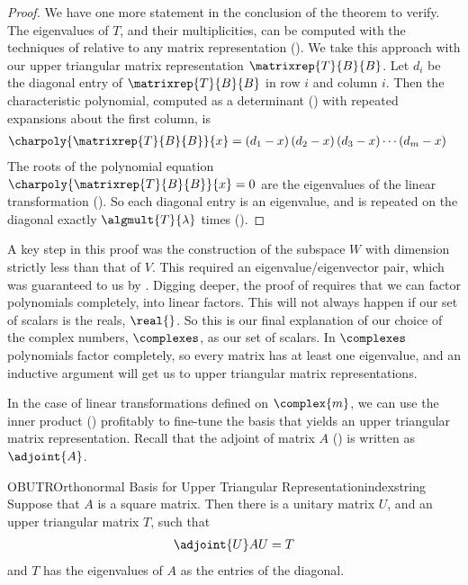 \begin{proof}
%
We have one more statement in the conclusion of the theorem to verify.  The eigenvalues of $T$, and their multiplicities, can be computed with the techniques of  relative to any matrix representation (). We take this approach with our upper triangular matrix representation $\matrixrep{T}{B}{B}$.  Let $d_i$ be the diagonal entry of $\matrixrep{T}{B}{B}$ in row $i$ and column $i$.  Then the characteristic polynomial, computed as a determinant () with repeated expansions about the first column, is 
%
\begin{align*}
\charpoly{\matrixrep{T}{B}{B}}{x}&=
\left(d_1-x\right)
\left(d_2-x\right)
\left(d_3-x\right)
\cdots
\left(d_m-x\right)
\end{align*}
%
The roots of the polynomial equation $\charpoly{\matrixrep{T}{B}{B}}{x}=0$ are the eigenvalues of the linear transformation ().  So each diagonal entry is an eigenvalue, and is repeated on the diagonal exactly $\algmult{T}{\lambda}$ times ().
%
\end{proof}
%
A key step in this proof was the construction of the subspace $W$ with dimension strictly less than that of $V$.  This required an eigenvalue/eigenvector pair, which was guaranteed to us by .  Digging deeper, the proof of  requires that we can factor polynomials completely, into linear factors.  This will not always happen if our set of scalars is the reals, $\real{\null}$.  So this is our final explanation of our choice of the complex numbers, $\complexes$, as our set of scalars.  In $\complexes$ polynomials factor completely, so every matrix has at least one eigenvalue, and an inductive argument will get us to upper triangular matrix representations.\par
%
In the case of linear transformations defined on $\complex{m}$, we can use the inner product () profitably to fine-tune the basis that yields an upper triangular matrix representation.  Recall that the adjoint of matrix $A$ () is written as $\adjoint{A}$.
%
\begin{theorem}{OBUTR}{Orthonormal Basis for Upper Triangular Representation}{indexstring}
Suppose that $A$ is a square matrix.  Then there is a unitary matrix $U$, and an upper triangular matrix $T$, such that
%
\begin{align*}
\adjoint{U}AU=T
\end{align*}
%
and $T$ has the eigenvalues of $A$ as the entries of the diagonal.
\end{theorem}
